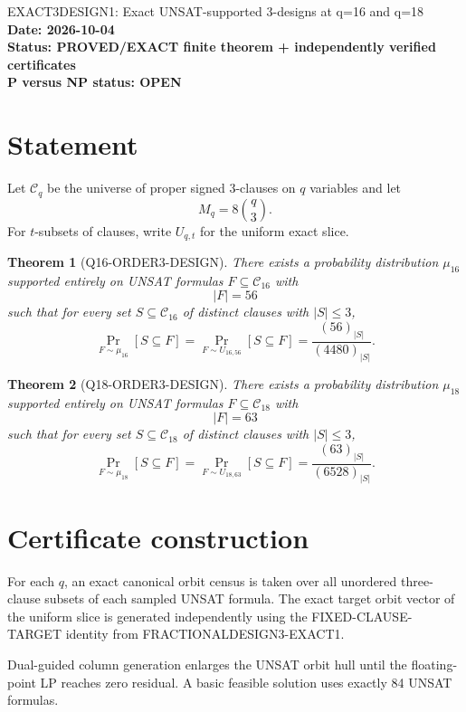 \documentclass[11pt]{article}
\newtheorem{theorem}{Theorem}
\begin{document}
\begin{center}
{\Large EXACT3DESIGN1: Exact UNSAT-supported 3-designs at q=16 and q=18}\\[4pt]
\textbf{Date: 2026-10-04}\\
\textbf{Status: PROVED/EXACT finite theorem + independently verified certificates}\\
\textbf{P versus NP status: OPEN}
\end{center}

\section{Statement}

Let \(\mathcal C_q\) be the universe of proper signed 3-clauses on \(q\)
variables and let
\[
M_q=8\binom q3.
\]
For \(t\)-subsets of clauses, write \(U_{q,t}\) for the uniform exact slice.

\begin{theorem}[Q16-ORDER3-DESIGN]
There exists a probability distribution \(\mu_{16}\) supported entirely on
UNSAT formulas \(F\subseteq\mathcal C_{16}\) with
\[
|F|=56
\]
such that for every set \(S\subseteq\mathcal C_{16}\) of distinct clauses
with \(|S|\le3\),
\[
\Pr_{F\sim\mu_{16}}[S\subseteq F]
=
\Pr_{F\sim U_{16,56}}[S\subseteq F]
=
\frac{(56)_{|S|}}{(4480)_{|S|}}.
\]
\end{theorem}

\begin{theorem}[Q18-ORDER3-DESIGN]
There exists a probability distribution \(\mu_{18}\) supported entirely on
UNSAT formulas \(F\subseteq\mathcal C_{18}\) with
\[
|F|=63
\]
such that for every set \(S\subseteq\mathcal C_{18}\) of distinct clauses
with \(|S|\le3\),
\[
\Pr_{F\sim\mu_{18}}[S\subseteq F]
=
\Pr_{F\sim U_{18,63}}[S\subseteq F]
=
\frac{(63)_{|S|}}{(6528)_{|S|}}.
\]
\end{theorem}

\section{Certificate construction}

For each \(q\), an exact canonical orbit census is taken over all unordered
three-clause subsets of each sampled UNSAT formula.  The exact target orbit
vector of the uniform slice is generated independently using the
FIXED-CLAUSE-TARGET identity from FRACTIONALDESIGN3-EXACT1.

Dual-guided column generation enlarges the UNSAT orbit hull until the
floating-point LP reaches zero residual.  A basic feasible solution uses
exactly 84 UNSAT formulas.
\end{document}
